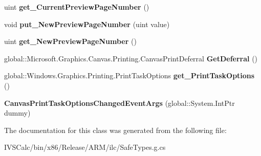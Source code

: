 \begin{DoxyCompactItemize}
uint {\bfseries get\+\_\+\+Current\+Preview\+Page\+Number} ()
\item 
\mbox{\label{class_microsoft_1_1_graphics_1_1_canvas_1_1_printing_1_1_canvas_print_task_options_changed_event_args_ad00cc403b4ebc7392b88631a0ee7623a}} 
void {\bfseries put\+\_\+\+New\+Preview\+Page\+Number} (uint value)
\item 
\mbox{\label{class_microsoft_1_1_graphics_1_1_canvas_1_1_printing_1_1_canvas_print_task_options_changed_event_args_aece38cbf64c40df9549397a3a81d1a0d}} 
uint {\bfseries get\+\_\+\+New\+Preview\+Page\+Number} ()
\item 
\mbox{\label{class_microsoft_1_1_graphics_1_1_canvas_1_1_printing_1_1_canvas_print_task_options_changed_event_args_a405c22ab90187c1e5c88e7b0adb39dc3}} 
global\+::\+Microsoft.\+Graphics.\+Canvas.\+Printing.\+Canvas\+Print\+Deferral {\bfseries Get\+Deferral} ()
\item 
\mbox{\label{class_microsoft_1_1_graphics_1_1_canvas_1_1_printing_1_1_canvas_print_task_options_changed_event_args_a922bb94ae905cc5d2fe097942446c874}} 
global\+::\+Windows.\+Graphics.\+Printing.\+Print\+Task\+Options {\bfseries get\+\_\+\+Print\+Task\+Options} ()
\item 
\mbox{\label{class_microsoft_1_1_graphics_1_1_canvas_1_1_printing_1_1_canvas_print_task_options_changed_event_args_a44eba7f824a24c6918f5415a6ffa01a0}} 
{\bfseries Canvas\+Print\+Task\+Options\+Changed\+Event\+Args} (global\+::\+System.\+Int\+Ptr dummy)
\end{DoxyCompactItemize}


The documentation for this class was generated from the following file\+:\begin{DoxyCompactItemize}
\item 
I\+V\+S\+Calc/bin/x86/\+Release/\+A\+R\+M/ilc/Safe\+Types.\+g.\+cs\end{DoxyCompactItemize}
